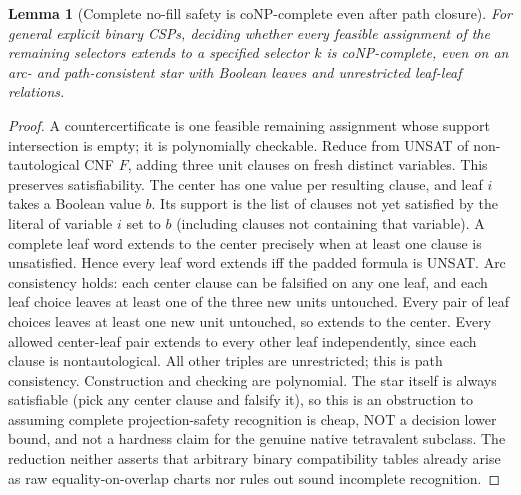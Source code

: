 \documentclass[11pt]{article}
\newtheorem{lemma}[theorem]{Lemma}
\begin{document}
\begin{lemma}[Complete no-fill safety is coNP-complete even after path closure]\label{lem:ds18-nofill}
For general explicit binary CSPs, deciding whether \emph{every} feasible assignment of the remaining selectors extends to a specified selector $k$ is coNP-complete, even on an arc- and path-consistent star with Boolean leaves and unrestricted leaf-leaf relations.
\end{lemma}
\begin{proof}
A countercertificate is one feasible remaining assignment whose support intersection is empty; it is polynomially checkable. Reduce from UNSAT of non-tautological CNF $F$, adding three unit clauses on fresh distinct variables. This preserves satisfiability. The center has one value per resulting clause, and leaf $i$ takes a Boolean value $b$. Its support is the list of clauses not yet satisfied by the literal of variable $i$ set to $b$ (including clauses not containing that variable). A complete leaf word extends to the center precisely when at least one clause is unsatisfied. Hence every leaf word extends iff the padded formula is UNSAT. Arc consistency holds: each center clause can be falsified on any one leaf, and each leaf choice leaves at least one of the three new units untouched. Every pair of leaf choices leaves at least one new unit untouched, so extends to the center. Every allowed center-leaf pair extends to every other leaf independently, since each clause is nontautological. All other triples are unrestricted; this is path consistency. Construction and checking are polynomial. The star itself is always satisfiable (pick any center clause and falsify it), so this is an obstruction to assuming complete projection-safety recognition is cheap, NOT a decision lower bound, and not a hardness claim for the genuine native tetravalent subclass. The reduction neither asserts that arbitrary binary compatibility tables already arise as raw equality-on-overlap charts nor rules out sound incomplete recognition.
\end{proof}
\end{document}
